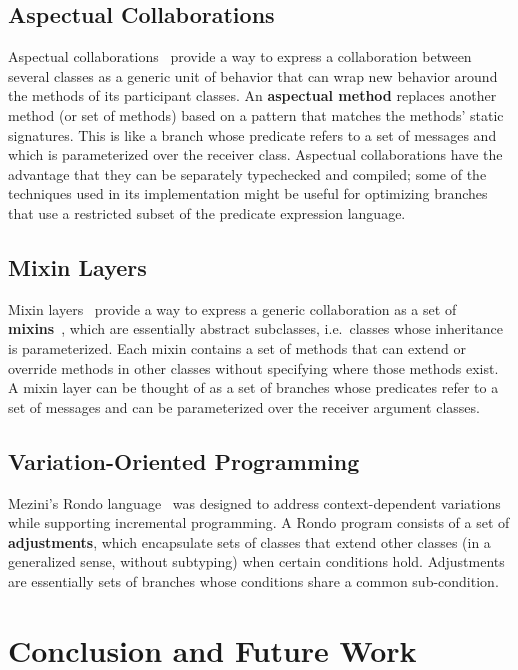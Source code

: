 \documentclass{acm_proc_article-sp}
\newcommand{\defn}[1]{\textbf{#1}}
\begin{document}
\subsection{Aspectual Collaborations}

Aspectual collaborations~\cite{asp-collab} provide a way to express a
collaboration between several classes as a generic unit of behavior
that can wrap new behavior around the methods of its participant
classes.  An \defn{aspectual method} replaces another method (or set
of methods) based on a pattern that matches the methods' static
signatures.  This is like a branch whose predicate refers to a set of
messages and which is parameterized over the receiver class.
Aspectual collaborations have the advantage that they can be
separately typechecked and compiled; some of the techniques used in
its implementation might be useful for optimizing branches that use a
restricted subset of the predicate expression language.

\subsection{Mixin Layers}

Mixin layers~\cite{mixin-layers} provide a way to express a generic
collaboration as a set of \defn{mixins}~\cite{mixins}, which are
essentially abstract subclasses, i.e.~classes whose inheritance is
parameterized.  Each mixin contains a set of methods that can extend
or override methods in other classes without specifying where those
methods exist.  A mixin layer can be thought of as a set of branches
whose predicates refer to a set of messages and can be parameterized
over the receiver argument classes.

\subsection{Variation-Oriented Programming}

Mezini's Rondo language~\cite{mezini-thesis} was designed to address
context-dependent variations while supporting incremental programming.
A Rondo program consists of a set of \defn{adjustments}, which
encapsulate sets of classes that extend other classes (in a
generalized sense, without subtyping) when certain conditions hold.
Adjustments are essentially sets of branches whose conditions share a
common sub-condition.

\section{Conclusion and Future Work}
\label{section:conclusion}
\end{document}
